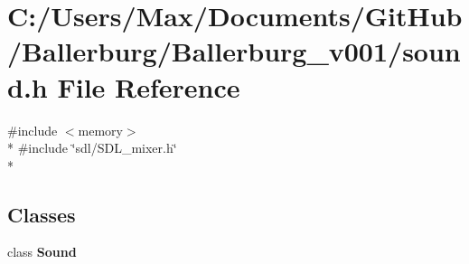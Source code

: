 \section{C\+:/\+Users/\+Max/\+Documents/\+Git\+Hub/\+Ballerburg/\+Ballerburg\+\_\+v001/sound.h File Reference}
\label{sound_8h}
{\ttfamily \#include $<$memory$>$}\\*
{\ttfamily \#include \char`\"{}sdl/\+S\+D\+L\+\_\+mixer.\+h\char`\"{}}\\*
\subsection*{Classes}
\begin{DoxyCompactItemize}
\item 
class {\bf Sound}
\end{DoxyCompactItemize}
